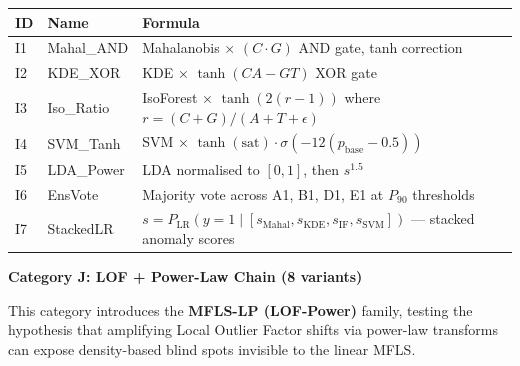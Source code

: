\documentclass[
  11pt,
]{article}
\newcounter{none} %
\begin{document}
{\def\LTcaptype{none} %
\begin{longtable}[]{@{}
  >{\raggedright\arraybackslash}p{}
  >{\raggedright\arraybackslash}p{}
  >{\raggedright\arraybackslash}p{}@{}}
\toprule\noalign{}
\begin{minipage}[b]{\linewidth}\raggedright
ID
\end{minipage} & \begin{minipage}[b]{\linewidth}\raggedright
Name
\end{minipage} & \begin{minipage}[b]{\linewidth}\raggedright
Formula
\end{minipage} \\
\midrule\noalign{}
\endhead
\bottomrule\noalign{}
\endlastfoot
I1 & Mahal\_AND & Mahalanobis × \((C \cdot G)\) AND gate, tanh
correction \\
I2 & KDE\_XOR & KDE × \(\tanh(CA - GT)\) XOR gate \\
I3 & Iso\_Ratio & IsoForest × \(\tanh(2(r-1))\) where
\(r = (C+G)/(A+T+\epsilon)\) \\
I4 & SVM\_Tanh & SVM ×
\(\tanh(\text{sat}) \cdot \sigma(-12(p_{\text{base}}-0.5))\) \\
I5 & LDA\_Power & LDA normalised to \([0,1]\), then \(s^{1.5}\) \\
I6 & EnsVote & Majority vote across A1, B1, D1, E1 at \(P_{90}\)
thresholds \\
I7 & StackedLR &
\(s = P_{\text{LR}}(y=1 \mid [s_{\text{Mahal}}, s_{\text{KDE}}, s_{\text{IF}}, s_{\text{SVM}}])\)
— stacked anomaly scores \\
\end{longtable}
}

\textbf{Category J: LOF + Power-Law Chain (8 variants)}

This category introduces the \textbf{MFLS-LP (LOF-Power)} family,
testing the hypothesis that amplifying Local Outlier Factor shifts via
power-law transforms can expose density-based blind spots invisible to
the linear MFLS.
\end{document}
